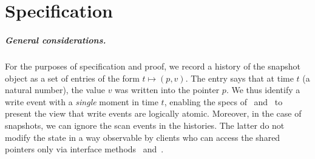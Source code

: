 \section{Specification}
\label{sc:formal}


\def\histx{\hist_\x}
\def\histy{\hist_\y}
\def\histp{\hist_p}

\newcommand{\sx}{S_\x}
\newcommand{\sy}{S_\y}
\newcommand{\spp}{S_p}
\newcommand{\sss}{S_s}
\newcommand{\wx}{W_\x}
\newcommand{\wy}{W_\y}
\newcommand{\wpp}{W_p}


\def\toff{t_{\mathsf{off}}}




\subparagraph*{General considerations.}
%
For the purposes of specification and proof, we record a history of
the snapshot object as a set of entries of the form $t \mapsto (p,
v)$. The entry says that at time $t$ (a natural number), the value $v$
was written into the pointer $p$. We thus identify a write event with
a \emph{single} moment in time $t$, enabling the specs of
\jywrite\ and \jyscan\ to present the view that write events are
logically atomic.
%
Moreover, in the case of snapshots, we can ignore the scan events in
the histories. The latter do not modify the state in a way observable
by clients who can access the shared pointers only via interface
methods \jywrite\ and\ \jyscan.

